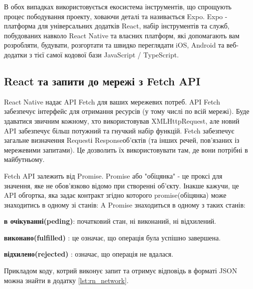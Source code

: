 В обох випадках використовується екосистема інструментів, що спрощують процес пободування проекту, ховаючи деталі та називається Expo.
Expo - платформа для універсальних додатків React, набір інструментів та служб, побудованих навколо React Native та власних платформ, які допомагають вам розробляти, будувати, розгортати та швидко переглядати iOS, Android та веб-додатки з тієї самої кодової бази JavaScript / TypeScript.\cite{expo_doc}

\subsection{React та запити до мережі з Fetch API}
\label{subsec:rn_fetch_api}
React Native надає API Fetch для ваших мережевих потреб.
API Fetch забезпечує інтерфейс для отримання ресурсів (у тому числі по всій мережі).
Буде здаватися звичним кожному, хто використовував XMLHttpRequest, але новий API забезпечує більш потужний та гнучкий набір функцій.
Fetch забезпечує загальне визначення Requestі Responseоб'єктів (та інших речей, пов'язаних із мережевими запитами).
Це дозволить їх використовувати там, де вони потрібні в майбутньому.

Fetch API залежить від Promise.
Promise або "обіцянка" - це проксі для значення, яке не обов'язково відомо при створенні об'єкту.\cite{promise_doc}
Інакше кажучи, це API обгортка, яка задає контракт згідно которого promise(обіцянка) може знаходитись в одному зі станів:
A Promise знаходиться в одному з таких станів:
\begin{itemize}
    \begin{item}
        \textbf{в очікуванні(peding)}: початковий стан, ні виконаний, ні відхилений.
    \end{item}
    \begin{item}
        \textbf{виконано(fulfilled)} : це означає, що операція була успішно завершена.
    \end{item}
    \begin{item}
        \textbf{відхилено(rejected)} : означає, що операція не вдалася.
    \end{item}
\end{itemize}

Прикладом коду, котрий виконує запит та отримує відповідь в форматі JSON можна знайти в додатку \ref{lst:rn_network}.

